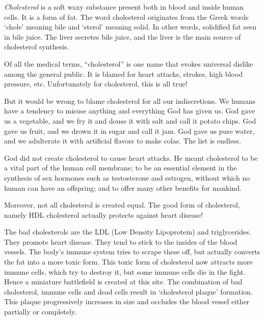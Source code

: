 \textit{Cholesterol} is a soft waxy substance present both in blood and inside human cells. It is a form of fat. The word cholesterol originates from the Greek words ‘chole’ meaning bile and ‘sterol’ meaning solid. In other words, solidified fat seen in bile juice. The liver secretes bile juice, and the liver is the main source of cholesterol synthesis.

Of all the medical terms, “cholesterol” is one name that evokes universal dislike among the general public. It is blamed for heart attacks, strokes, high blood pressure, etc. Unfortunately for cholesterol, this is all true!

But it would be wrong to blame cholesterol for all our indiscretions. We humans have a tendency to misuse anything and everything God has given us. God gave us a vegetable, and we fry it and douse it with salt and call it potato chips. God gave us fruit, and we drown it in sugar and call it jam. God gave us pure water, and we adulterate it with artificial flavors to make colas. The list is endless.

God did not create cholesterol to cause heart attacks. He meant cholesterol to be a vital part of the human cell membrane; to be an essential element in the synthesis of sex hormones such as testosterone and estrogen, without which no human can have an offspring; and to offer many other benefits for mankind.

Moreover, not all cholesterol is created equal. The good form of cholesterol, namely HDL cholesterol actually protects against heart disease!

The bad cholesterols are the LDL (Low Density Lipoprotein) and triglycerides. They promote heart disease. They tend to stick to the insides of the blood vessels. The body’s immune system tries to scrape these off, but actually converts the fat into a more toxic form. This toxic form of cholesterol now attracts more immune cells, which try to destroy it, but some immune cells die in the fight. Hence a miniature battlefield is created at this site. The combination of bad cholesterol, immune cells and dead cells result in ‘cholesterol plaque’ formation. This plaque progressively increases in size and occludes the blood vessel either partially or completely.

